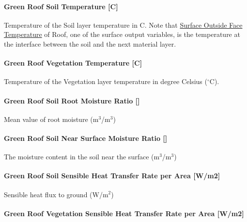 \paragraph{Green Roof Soil Temperature {[}C{]}}\label{green-roof-soil-temperature-c}

Temperature of the Soil layer temperature in C. Note that \hyperref[surface-outside-face-temperature-c]{Surface Outside Face Temperature} of Roof, one of the surface output variables, is the temperature at the interface between the soil and the next material layer.

\paragraph{Green Roof Vegetation Temperature {[}C{]}}\label{green-roof-vegetation-temperature-c}

Temperature of the Vegetation layer temperature in degree Celsius ($^\circ$C).

\paragraph{Green Roof Soil Root Moisture Ratio {[]}}\label{green-roof-soil-root-moisture-ratio}

Mean value of root moisture (m\(^{3}\)/m\(^{3}\))

\paragraph{Green Roof Soil Near Surface Moisture Ratio {[]}}\label{green-roof-soil-near-surface-moisture-ratio}

The moisture content in the soil near the surface (m\(^{3}\)/m\(^{3}\))

\paragraph{Green Roof Soil Sensible Heat Transfer Rate per Area {[}W/m2{]}}\label{green-roof-soil-sensible-heat-transfer-rate-per-area-wm2}

Sensible heat flux to ground (W/m\(^{2}\))

\paragraph{Green Roof Vegetation Sensible Heat Transfer Rate per Area {[}W/m2{]}}\label{green-roof-vegetation-sensible-heat-transfer-rate-per-area-wm2}

